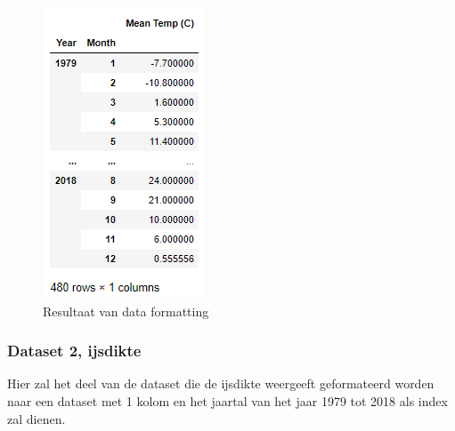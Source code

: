 \begin{figure}
    \centering
    \caption{Resultaat van data formatting}
    \label{fig:tempdata}
    \includegraphics[width=0.3\linewidth]{temp_data}
\end{figure}



\clearpage



\subsubsection{Dataset 2, ijsdikte}

Hier zal het deel van de dataset die de ijsdikte weergeeft geformateerd worden naar een dataset met 1 kolom en het jaartal van het jaar 1979 tot 2018 als index zal dienen.

